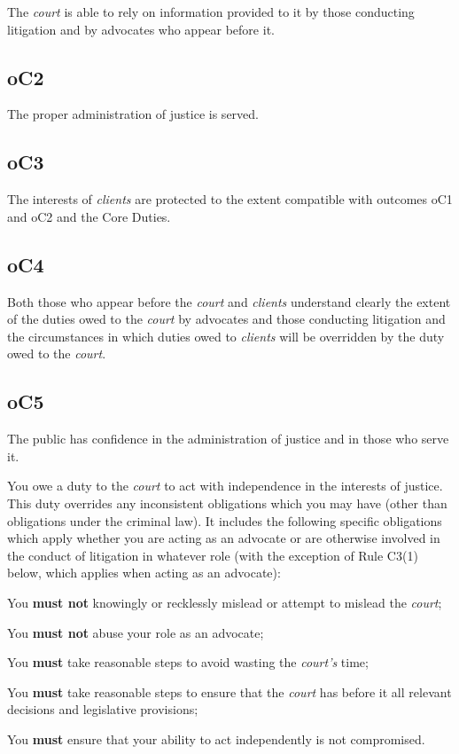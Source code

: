 The \emph{court} is able to rely on information provided to it by those
conducting litigation and by advocates who appear before it.

\subsection{\color{bleu}oC2}

The proper administration of justice is served.

\subsection{\color{bleu}oC3}

The interests of \emph{clients} are protected to the extent compatible
with outcomes oC1 and oC2 and the Core Duties.

\subsection{\color{bleu}oC4}

Both those who appear before the \emph{court} and \emph{clients}
understand clearly the extent of the duties owed to the \emph{court} by
advocates and those conducting litigation and the circumstances in which
duties owed to \emph{clients} will be overridden by the duty owed to the
\emph{court}.

\subsection{\color{bleu}oC5}

The public has confidence in the administration of justice and in those
who serve it.




You owe a duty to the \emph{court} to act with independence in the
interests of justice. This duty overrides any inconsistent obligations
which you may have (other than obligations under the criminal law). It
includes the following specific obligations which apply whether you are
acting as an advocate or are otherwise involved in the conduct of
litigation in whatever role (with the exception of Rule C3(1) below,
which applies when acting as an advocate):

\begin{numlist}\item You \textcolor{myred}{\textbf{must not}} knowingly or recklessly mislead or attempt to mislead
the \emph{court};
\item You \textcolor{myred}{\textbf{must not}} abuse your role as an advocate;
\item You \textcolor{myred}{\textbf{must}} take reasonable steps to avoid wasting the \emph{court's}
time;
\item You \textcolor{myred}{\textbf{must}} take reasonable steps to ensure that the \emph{court} has
before it all relevant decisions and legislative provisions;
\item You \textcolor{myred}{\textbf{must}} ensure that your ability to act independently is not
compromised.
\end{numlist}

